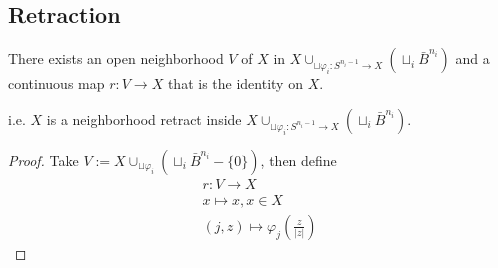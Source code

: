 \documentclass[Total.tex]{subfiles}
\begin{document}
	\subsection{Retraction}
	\begin{lemma}
		There exists an open neighborhood $V$ of $X$ in $X\cup_{\sqcup \varphi_i:S^{n_i-1}\rightarrow X} (\sqcup_i \bar{B}^{n_i})$ and a continuous map $r:V\rightarrow X$ that is the identity on $X$.
		
		i.e. $X$ is a neighborhood retract inside $X\cup_{\sqcup \varphi_i:S^{n_i-1}\rightarrow X} (\sqcup_i \bar{B}^{n_i})$.
	\end{lemma}
	\begin{proof}
		Take $V:=X\cup_{\sqcup \varphi_i} (\sqcup_i \bar{B}^{n_i}-\{0\})$, then define
		\begin{gather*}
			r:V\rightarrow X\\
			x\mapsto x,x\in X\\
			(j,z)\mapsto \varphi_j(\frac{z}{|z|})
		\end{gather*}
	\end{proof}
	\begin{center}
	\end{center}
\end{document}
